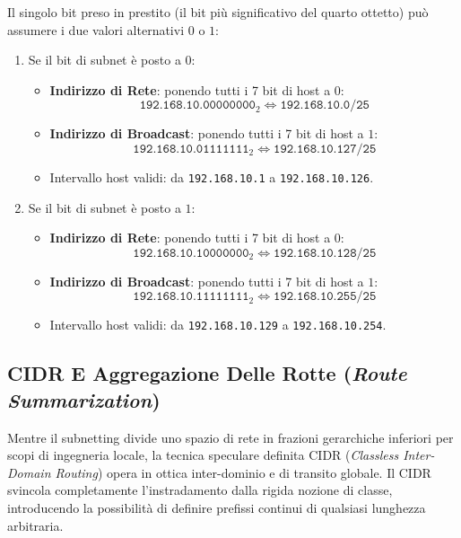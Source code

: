 \documentclass[11pt, a4paper]{article}
\begin{document}
Il singolo bit preso in prestito (il bit più significativo del quarto ottetto) può assumere i due valori alternativi $0$ o $1$:
\begin{enumerate}
    \item Se il bit di subnet è posto a $0$:
    \begin{itemize}
        \item \textbf{Indirizzo di Rete}: ponendo tutti i 7 bit di host a $0$:
        \[
        \texttt{192.168.10.00000000}_2 \iff \texttt{192.168.10.0/25}
        \]
        \item \textbf{Indirizzo di Broadcast}: ponendo tutti i 7 bit di host a $1$:
        \[
        \texttt{192.168.10.01111111}_2 \iff \texttt{192.168.10.127/25}
        \]
        \item Intervallo host validi: da \texttt{192.168.10.1} a \texttt{192.168.10.126}.
    \end{itemize}
    \item Se il bit di subnet è posto a $1$:
    \begin{itemize}
        \item \textbf{Indirizzo di Rete}: ponendo tutti i 7 bit di host a $0$:
        \[
        \texttt{192.168.10.10000000}_2 \iff \texttt{192.168.10.128/25}
        \]
        \item \textbf{Indirizzo di Broadcast}: ponendo tutti i 7 bit di host a $1$:
        \[
        \texttt{192.168.10.11111111}_2 \iff \texttt{192.168.10.255/25}
        \]
        \item Intervallo host validi: da \texttt{192.168.10.129} a \texttt{192.168.10.254}.
    \end{itemize}
\end{enumerate}



\subsection{CIDR E Aggregazione Delle Rotte (\emph{Route Summarization})}
Mentre il subnetting divide uno spazio di rete in frazioni gerarchiche inferiori per scopi di ingegneria locale, la tecnica speculare definita CIDR (\emph{Classless Inter-Domain Routing}) opera in ottica inter-dominio e di transito globale. Il CIDR svincola completamente l'instradamento dalla rigida nozione di classe, introducendo la possibilità di definire prefissi continui di qualsiasi lunghezza arbitraria.
\end{document}
